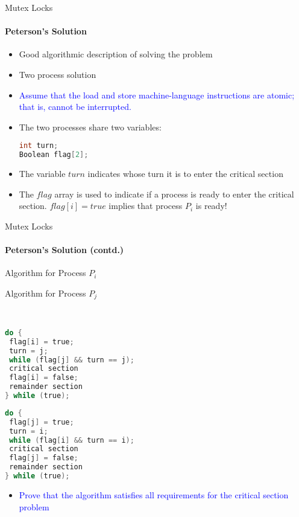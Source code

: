 \documentclass[10pt]{beamer}
\begin{document}
\begin{frame}[fragile]{Mutex Locks}
\framesubtitle{Peterson's Solution}
\begin{itemize}
 
\item Good algorithmic description of solving the problem
\item Two process solution
\item \textcolor{blue}{Assume that the \alert{load} and \alert{store} machine-language instructions are atomic; that is, cannot be interrupted.}
\item The two processes share two variables:
\vspace{6pt}\\
\begin{uncoverenv}
\begin{lstlisting}[language=C]
int turn;
Boolean flag[2];
\end{lstlisting}
\end{uncoverenv}
\item The variable $turn$ indicates whose turn it is to enter the critical section
\item The $flag$ array is used to indicate if a process is ready to enter the critical section. $flag[i] = true$ implies that process $P_i$ is ready!
\end{itemize}
\end{frame}

\begin{frame}[fragile]{Mutex Locks}
\framesubtitle{Peterson's Solution (contd.)}
\centering
\begin{minipage}{.45\linewidth}
\centering
Algorithm for Process $P_i$
\end{minipage}
\hspace{13pt}
\begin{minipage}{.45\linewidth}
\centering
Algorithm for Process $P_j$
\end{minipage}
\vspace{6pt}\\
\begin{minipage}{.49\linewidth}
\begin{lstlisting}[language=C]
do {
 flag[i] = true;
 turn = j;
 while (flag[j] && turn == j);
 critical section
 flag[i] = false;
 remainder section
} while (true);
\end{lstlisting}
\end{minipage}
\hspace{13pt}
\begin{minipage}{.49\linewidth}
\begin{lstlisting}[language=C]
do {
 flag[j] = true;
 turn = i;
 while (flag[i] && turn == i);
 critical section
 flag[j] = false;
 remainder section
} while (true);
\end{lstlisting}
\end{minipage}
\begin{itemize}
\item \textcolor{blue}{Prove that the algorithm satisfies all requirements for the critical section problem}
\end{itemize}
\end{frame}
\end{document}
